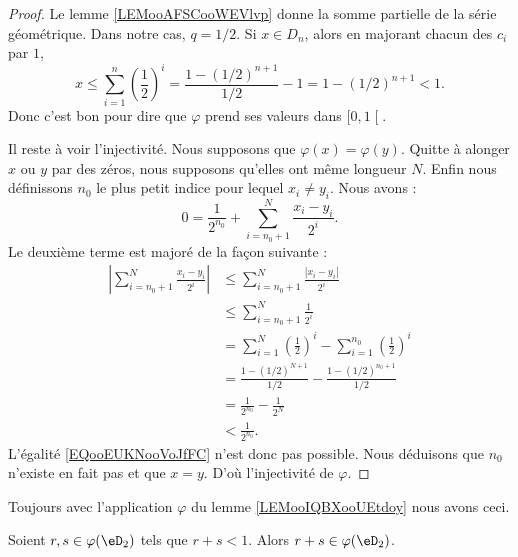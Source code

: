 \begin{proof}
    Le lemme \ref{LEMooAFSCooWEVlvp} donne la somme partielle de la série géométrique. Dans notre cas, \( q=1/2\). Si \( x\in D_n\), alors en majorant chacun des \( c_i\) par \( 1\),
    \begin{equation}
        x\leq \sum_{i=1}^n\left( \frac{ 1 }{2} \right)^i=\frac{ 1-(1/2)^{n+1} }{ 1/2 }-1=1-(1/2)^{n+1}<1.
    \end{equation}
    Donc c'est bon pour dire que \( \varphi\) prend ses valeurs dans \( \mathopen[ 0 , 1 \mathclose[\).

    Il reste à voir l'injectivité. Nous supposons que \( \varphi(x)=\varphi(y)\). Quitte à alonger \( x\) ou \( y\) par des zéros, nous supposons qu'elles ont même longueur \( N\). Enfin nous définissons \( n_0\) le plus petit indice pour lequel \( x_i\neq y_i\). Nous avons :
    \begin{equation}        \label{EQooEUKNooVoJfFC}
        0=\frac{1}{ 2^{n_0} }+\sum_{i=n_0+1}^N\frac{ x_i-y_i }{ 2^i }.
    \end{equation}
    Le deuxième terme est majoré de la façon suivante :
    \begin{subequations}
        \begin{align}
            | \sum_{i=n_0+1}^N\frac{ x_i-y_i }{ 2^i } |&\leq \sum_{i=n_0+1}^N\frac{ | x_i-y_i | }{ 2^i }\\
            &\leq\sum_{i=n_0+1}^N\frac{ 1 }{ 2^i }\\
            &=\sum_{i=1}^N\left( \frac{ 1 }{2} \right)^i-\sum_{i=1}^{n_0}\left( \frac{ 1 }{2} \right)^i\\
            &=\frac{ 1-(1/2)^{N+1} }{ 1/2 }-\frac{ 1-(1/2)^{n_0+1} }{ 1/2 }\\
            &=\frac{1}{ 2^{n_0} }-\frac{1}{ 2^N }\\
            &<\frac{1}{ 2^{n_0} }.
        \end{align}
    \end{subequations}
    L'égalité \eqref{EQooEUKNooVoJfFC} n'est donc pas possible. Nous déduisons que \( n_0\) n'existe en fait pas et que \( x=y\). D'où l'injectivité de \( \varphi\).
\end{proof}

Toujours avec l'application \( \varphi\) du lemme \ref{LEMooIQBXooUEtdoy} nous avons ceci.
\begin{lemma}       \label{LEMooVDPWooWLQzbF}
    Soient \( r,s\in \varphi(\eD_2)\) tels que \( r+s<1\). Alors \( r+s\in \varphi(\eD_2)\).
\end{lemma}

